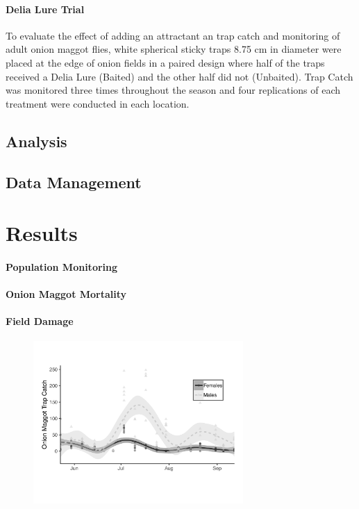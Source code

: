 \documentclass[alpha-refs]{wiley-article}
\begin{document}
\paragraph{Delia Lure Trial}
To evaluate the effect of adding an attractant an trap catch and monitoring of adult onion maggot flies, white spherical sticky traps 8.75 cm in diameter were placed at the edge of onion fields in a paired design where half of the traps received a Delia Lure (Baited) and the other half did not (Unbaited).  Trap Catch was monitored three times throughout the season and four replications of each treatment were conducted in each location.  


\subsection{Analysis}
\subsection{Data Management}


\section{Results}

\paragraph{Population Monitoring}

\paragraph{Onion Maggot Mortality}

\paragraph{Field Damage}



\begin{figure}[bt]
\centering
\includegraphics[width = 8cm]{figures/final-figures/figure-1.pdf}
\caption{ }
\label{fig:figure1}
\end{figure}
\end{document}
